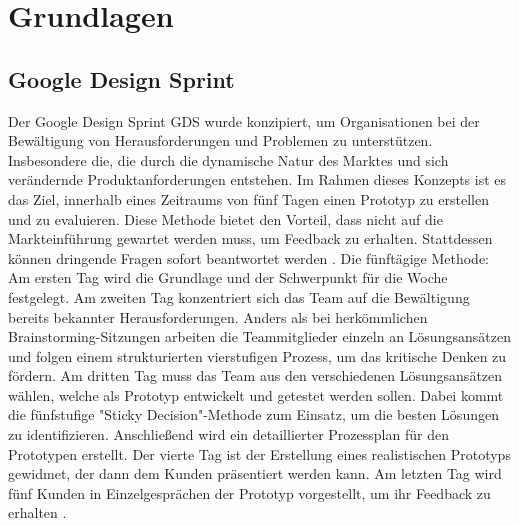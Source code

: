 \chapter{Grundlagen}

\section{Google Design Sprint}
Der Google Design Sprint \ac{GDS} wurde konzipiert, um Organisationen bei der Bewältigung von Herausforderungen und Problemen zu unterstützen. Insbesondere die, die durch die dynamische Natur des Marktes und sich verändernde Produktanforderungen entstehen. Im Rahmen dieses Konzepts ist es das Ziel, innerhalb eines Zeitraums von fünf Tagen einen Prototyp zu erstellen und zu evaluieren. Diese Methode bietet den Vorteil, dass nicht auf die Markteinführung gewartet werden muss, um Feedback zu erhalten. Stattdessen können dringende Fragen sofort beantwortet werden \cite[vgl.][S.98 f.]{Design_Sprint}.
Die fünftägige Methode:
Am ersten Tag wird die Grundlage und der Schwerpunkt für die Woche festgelegt. Am zweiten Tag konzentriert sich das Team auf die Bewältigung bereits bekannter Herausforderungen. Anders als bei herkömmlichen Brainstorming-Sitzungen arbeiten die Teammitglieder einzeln an Lösungsansätzen und folgen einem strukturierten vierstufigen Prozess, um das kritische Denken zu fördern.
Am dritten Tag muss das Team aus den verschiedenen Lösungsansätzen wählen, welche als Prototyp entwickelt und getestet werden sollen. Dabei kommt die fünfstufige "Sticky Decision"-Methode zum Einsatz, um die besten Lösungen zu identifizieren. Anschließend wird ein detaillierter Prozessplan für den Prototypen erstellt. 
Der vierte Tag ist der Erstellung eines realistischen Prototyps gewidmet, der dann dem Kunden präsentiert werden kann. Am letzten Tag wird fünf Kunden in Einzelgesprächen der Prototyp vorgestellt, um ihr Feedback zu erhalten \cite[vgl.][S.99]{Design_Sprint}.